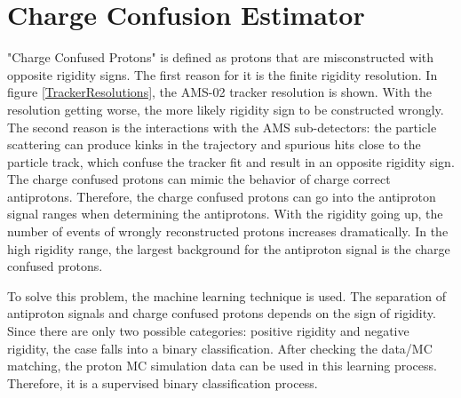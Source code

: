 
\section{Charge Confusion Estimator} \label{chargeconfusion}

"Charge Confused Protons" is defined as protons that are misconstructed with opposite rigidity signs. The first reason for it is the finite rigidity resolution. In figure \ref{TrackerResolutions}, the AMS-02 tracker resolution is shown. With the resolution getting worse, the more likely rigidity sign to be constructed wrongly. The second reason is the interactions with the AMS sub-detectors: the particle scattering can produce kinks in the trajectory and spurious hits close to the particle track, which confuse the tracker fit and result in an opposite rigidity sign. The charge confused protons can mimic the behavior of charge correct antiprotons. Therefore, the charge confused protons can go into the antiproton signal ranges when determining the antiprotons. With the rigidity going up, the number of events of wrongly reconstructed protons increases dramatically. In the high rigidity range, the largest background for the antiproton signal is the charge confused protons. \par    



To solve this problem, the machine learning technique is used. The separation of antiproton signals and charge confused protons depends on the sign of rigidity. Since there are only two possible categories: positive rigidity and negative rigidity, the case falls into a binary classification. After checking the data/MC matching, the proton MC simulation data can be used in this learning process. Therefore, it is a supervised binary classification process. \par   

